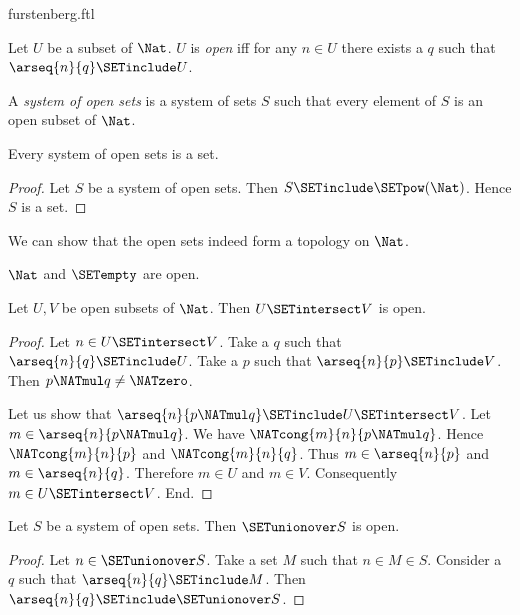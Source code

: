 \documentclass{article}
\begin{document}
\begin{smodule}{furstenberg.ftl}
\begin{forthel}
  \begin{definition}
    Let $U$ be a subset of $\Nat$.
    $U$ is \emph{open} iff for any $n \in U$ there exists a $q$ such that
    $\arseq{n}{q} \SETinclude U$.
  \end{definition}

  \begin{definition}
    A \emph{system of open sets} is a system of sets $S$ such that every element of
    $S$ is an open subset of $\Nat$.
  \end{definition}

  \begin{lemma}
    Every system of open sets is a set.
  \end{lemma}
  \begin{proof}
    Let $S$ be a system of open sets.
    Then $S \SETinclude \SETpow(\Nat)$.
    Hence $S$ is a set.
  \end{proof}
\end{forthel}

We can show that the open sets indeed form a topology on $\Nat$.

\begin{forthel}
  \begin{lemma}
    $\Nat$ and $\SETempty$ are open.
  \end{lemma}

  \begin{lemma}
    Let $U,V$ be open subsets of $\Nat$.
    Then $U \SETintersect V$ is open.
  \end{lemma}
  \begin{proof}
    Let $n \in U \SETintersect V$.
    Take a $q$ such that $\arseq{n}{q} \SETinclude U$.
    Take a $p$ such that $\arseq{n}{p} \SETinclude V$.
    Then $p \NATmul q \neq \NATzero$.

    Let us show that $\arseq{n}{p \NATmul q} \SETinclude U \SETintersect V$.
      Let $m \in \arseq{n}{p \NATmul q}$.
      We have $\NATcong{m}{n}{p \NATmul q}$.
      Hence $\NATcong{m}{n}{p}$ and $\NATcong{m}{n}{q}$.
      Thus $m \in \arseq{n}{p}$ and $m \in \arseq{n}{q}$.
      Therefore $m \in U$ and $m \in V$.
      Consequently $m \in U \SETintersect V$.
    End.
  \end{proof}

  \begin{lemma}
    Let $S$ be a system of open sets.
    Then $\SETunionover S$ is open.
  \end{lemma}
  \begin{proof}
    Let $n \in \SETunionover S$.
    Take a set $M$ such that $n \in M \in S$.
    Consider a $q$ such that $\arseq{n}{q} \SETinclude M$.
    Then $\arseq{n}{q} \SETinclude \SETunionover S$.
  \end{proof}
\end{forthel}


\end{smodule}
\end{document}
